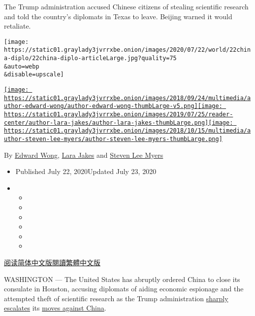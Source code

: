 The Trump administration accused Chinese citizens of stealing scientific
research and told the country's diplomats in Texas to leave. Beijing
warned it would retaliate.

\texttt{[image: https://static01.graylady3jvrrxbe.onion/images/2020/07/22/world/22china-diplo/22china-diplo-articleLarge.jpg?quality=75\\\&auto=webp\\\&disable=upscale]}

\href{https://www.nytimes3xbfgragh.onion/by/edward-wong}{\texttt{[image: https://static01.graylady3jvrrxbe.onion/images/2018/09/24/multimedia/author-edward-wong/author-edward-wong-thumbLarge-v5.png]}}\href{https://www.nytimes3xbfgragh.onion/by/lara-jakes}{\texttt{[image: https://static01.graylady3jvrrxbe.onion/images/2019/07/25/reader-center/author-lara-jakes/author-lara-jakes-thumbLarge.png]}}\href{https://www.nytimes3xbfgragh.onion/by/steven-lee-myers}{\texttt{[image: https://static01.graylady3jvrrxbe.onion/images/2018/10/15/multimedia/author-steven-lee-myers/author-steven-lee-myers-thumbLarge.png]}}

By \href{https://www.nytimes3xbfgragh.onion/by/edward-wong}{Edward
Wong}, \href{https://www.nytimes3xbfgragh.onion/by/lara-jakes}{Lara
Jakes} and
\href{https://www.nytimes3xbfgragh.onion/by/steven-lee-myers}{Steven Lee
Myers}

\begin{itemize}
\item
  Published July 22, 2020Updated July 23, 2020
\item
  \begin{itemize}
  \item
  \item
  \item
  \item
  \item
  \item
  \end{itemize}
\end{itemize}

\href{https://cn.nytimes3xbfgragh.onion/usa/20200722/us-china-houston-consulate/}{阅读简体中文版}\href{https://cn.nytimes3xbfgragh.onion/usa/20200722/us-china-houston-consulate/zh-hant/}{閱讀繁體中文版}

WASHINGTON --- The United States has abruptly ordered China to close its
consulate in Houston, accusing diplomats of aiding economic espionage
and the attempted theft of scientific research as the Trump
administration
\href{https://www.nytimes3xbfgragh.onion/2020/03/22/us/politics/coronavirus-us-china.html}{sharply
escalates} its
\href{https://www.nytimes3xbfgragh.onion/2020/07/23/world/asia/us-china-consulate.html}{moves
against China}.

